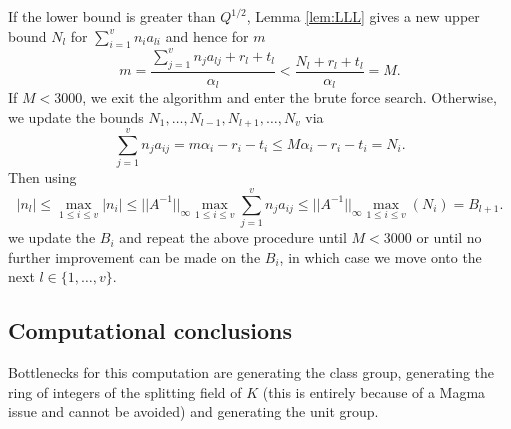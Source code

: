 If the lower bound is greater than $Q^{1/2}$, Lemma \ref{lem:LLL} gives a new upper bound $N_l$ for $\sum_{i = 1}^v n_{i}a_{li}$ and hence for $m$
\[m = \frac{\sum_{j = 1}^{v}n_ja_{lj} + r_l + t_l}{\alpha_l} < \frac{N_l+ r_l + t_l}{\alpha_l} = M.\]
If $M < 3000$, we exit the algorithm and enter the brute force search. Otherwise, we update the bounds $N_1, \dots, N_{l-1}, N_{l+1}, \dots, N_v$ via
\[\sum_{j=1}^v n_ja_{ij} = m\alpha_i - r_i - t_i \leq M\alpha_i - r_i - t_i = N_i.\]
Then using 
\[|n_l| \leq \max_{1 \leq i \leq v}|n_i| \leq ||A^{-1}||_{\infty}\max_{1 \leq i\leq v}\sum_{j = 1}^v n_j a_{ij}
\leq ||A^{-1}||_{\infty} \max_{1 \leq i\leq v}(N_i) = B_{l+1}.\]
we update the $B_i$ and repeat the above procedure until $M < 3000$ or until no further improvement can be made on the $B_i$, in which case we move onto the next $l \in \{1, \dots, v\}$.


\subsection{Computational conclusions}

Bottlenecks for this computation are generating the class group, generating the ring of integers of the splitting field of $K$ (this is entirely because of a Magma issue and cannot be avoided) and generating the unit group. 



